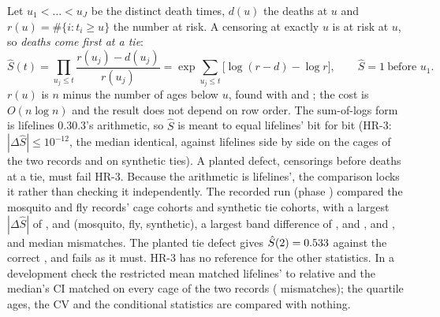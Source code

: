 Let $u_1<\dots<u_J$ be the distinct death times, $d(u)$ the deaths at $u$ and $r(u)=\#\{i: t_i\ge u\}$ the number at
risk. A censoring at exactly $u$ is at risk at $u$, so \emph{deaths come first at a tie}:
\begin{equation}\label{eq:surv-km}
  \hat S(t)=\prod_{u_j\le t}\frac{r(u_j)-d(u_j)}{r(u_j)}
  =\exp\sum_{u_j\le t}\big[\log(r-d)-\log r\big],\qquad \hat S=1\ \text{before } u_1 .
\end{equation}
$r(u)$ is $n$ minus the number of ages below $u$, found with  and 
; the cost is $O(n\log n)$ and the result does not depend on row order. The sum-of-logs form is
lifelines 0.30.3's arithmetic, so $\hat S$ is meant to equal lifelines' bit for bit (HR-3: $|\Delta\hat S|\le10^{-12}$,
the median identical, against lifelines side by side on the cages of the two records and on synthetic ties). A
planted defect, censorings before deaths at a tie, must fail HR-3. Because the arithmetic is lifelines', the
comparison locks it rather than checking it independently.
The recorded run (phase ) compared the mosquito and fly records' cage cohorts and  synthetic tie cohorts, with a largest
$|\Delta\hat S|$ of ,  and  (mosquito, fly, synthetic), a largest band difference of ,  and , and ,  and  median mismatches. The planted tie defect
gives $\hat S(2)=\verify{tests/acceptance/results/km_005.json}{planted.planted}{.3f}{0.533}$ against the correct , and fails as it must.
HR-3 has no reference for the other statistics. In a development check the restricted mean matched lifelines'
 to relative  and the median's CI matched on every cage of the two records
( mismatches); the quartile ages, the CV and the conditional statistics are compared with nothing.

